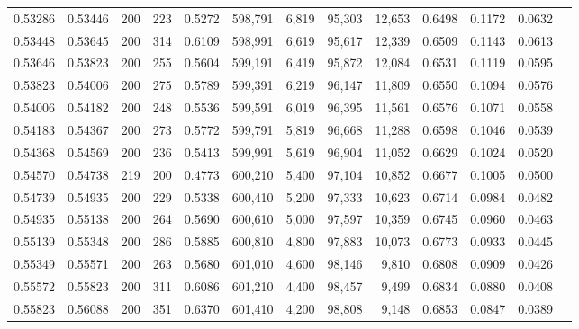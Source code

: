 \begin{tabular}{rrrrrrrrrrrrr}
0.53286 & 0.53446 &    200 & 223 &                                     0.5272 & 598,791 &   6,819 &  95,303 &  12,653 & 0.6498 & 0.1172 & 0.0632 \\
0.53448 & 0.53645 &    200 & 314 &                                     0.6109 & 598,991 &   6,619 &  95,617 &  12,339 & 0.6509 & 0.1143 & 0.0613 \\
0.53646 & 0.53823 &    200 & 255 &                                     0.5604 & 599,191 &   6,419 &  95,872 &  12,084 & 0.6531 & 0.1119 & 0.0595 \\
0.53823 & 0.54006 &    200 & 275 &                                     0.5789 & 599,391 &   6,219 &  96,147 &  11,809 & 0.6550 & 0.1094 & 0.0576 \\
0.54006 & 0.54182 &    200 & 248 &                                     0.5536 & 599,591 &   6,019 &  96,395 &  11,561 & 0.6576 & 0.1071 & 0.0558 \\
0.54183 & 0.54367 &    200 & 273 &                                     0.5772 & 599,791 &   5,819 &  96,668 &  11,288 & 0.6598 & 0.1046 & 0.0539 \\
0.54368 & 0.54569 &    200 & 236 &                                     0.5413 & 599,991 &   5,619 &  96,904 &  11,052 & 0.6629 & 0.1024 & 0.0520 \\
0.54570 & 0.54738 &    219 & 200 &                                     0.4773 & 600,210 &   5,400 &  97,104 &  10,852 & 0.6677 & 0.1005 & 0.0500 \\
0.54739 & 0.54935 &    200 & 229 &                                     0.5338 & 600,410 &   5,200 &  97,333 &  10,623 & 0.6714 & 0.0984 & 0.0482 \\
0.54935 & 0.55138 &    200 & 264 &                                     0.5690 & 600,610 &   5,000 &  97,597 &  10,359 & 0.6745 & 0.0960 & 0.0463 \\
0.55139 & 0.55348 &    200 & 286 &                                     0.5885 & 600,810 &   4,800 &  97,883 &  10,073 & 0.6773 & 0.0933 & 0.0445 \\
0.55349 & 0.55571 &    200 & 263 &                                     0.5680 & 601,010 &   4,600 &  98,146 &   9,810 & 0.6808 & 0.0909 & 0.0426 \\
0.55572 & 0.55823 &    200 & 311 &                                     0.6086 & 601,210 &   4,400 &  98,457 &   9,499 & 0.6834 & 0.0880 & 0.0408 \\
0.55823 & 0.56088 &    200 & 351 &                                     0.6370 & 601,410 &   4,200 &  98,808 &   9,148 & 0.6853 & 0.0847 & 0.0389 \\

\end{tabular}
